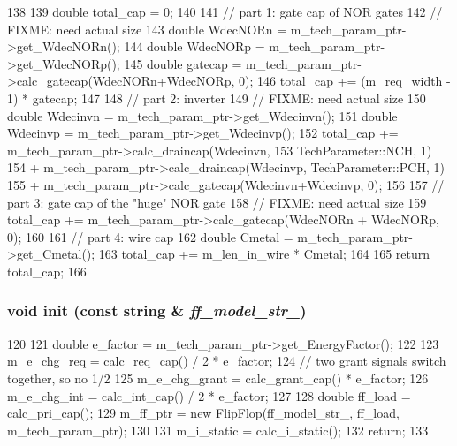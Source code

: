 \begin{DoxyCode}
138 {
139     double total_cap = 0;
140 
141     // part 1: gate cap of NOR gates
142     // FIXME: need actual size
143     double WdecNORn = m_tech_param_ptr->get_WdecNORn();
144     double WdecNORp = m_tech_param_ptr->get_WdecNORp();
145     double gatecap = m_tech_param_ptr->calc_gatecap(WdecNORn+WdecNORp, 0);
146     total_cap += (m_req_width - 1) * gatecap;
147 
148     // part 2: inverter
149     // FIXME: need actual size
150     double Wdecinvn = m_tech_param_ptr->get_Wdecinvn();
151     double Wdecinvp = m_tech_param_ptr->get_Wdecinvp();
152     total_cap += m_tech_param_ptr->calc_draincap(Wdecinvn, 
153                                                  TechParameter::NCH, 1)
154         + m_tech_param_ptr->calc_draincap(Wdecinvp, TechParameter::PCH, 1)
155         + m_tech_param_ptr->calc_gatecap(Wdecinvn+Wdecinvp, 0);
156 
157     // part 3: gate cap of the "huge" NOR gate
158     // FIXME: need actual size
159     total_cap += m_tech_param_ptr->calc_gatecap(WdecNORn + WdecNORp, 0);
160 
161     // part 4: wire cap
162     double Cmetal = m_tech_param_ptr->get_Cmetal();
163     total_cap += m_len_in_wire * Cmetal;
164 
165     return total_cap;
166 }
\end{DoxyCode}
\hypertarget{classMatrixArbiter_aa30ab0383b17214d69595df443fe4223}{
\subsubsection[{init}]{\setlength{\rightskip}{0pt plus 5cm}void init (const string \& {\em ff\_\-model\_\-str\_\-})}}
\label{classMatrixArbiter_aa30ab0383b17214d69595df443fe4223}



\begin{DoxyCode}
120 {
121     double e_factor = m_tech_param_ptr->get_EnergyFactor();
122 
123     m_e_chg_req = calc_req_cap() / 2 * e_factor;
124     // two grant signals switch together, so no 1/2
125     m_e_chg_grant = calc_grant_cap() * e_factor;
126     m_e_chg_int = calc_int_cap() / 2 * e_factor;
127 
128     double ff_load = calc_pri_cap();
129     m_ff_ptr = new FlipFlop(ff_model_str_, ff_load, m_tech_param_ptr);
130 
131     m_i_static = calc_i_static();
132     return;
133 }
\end{DoxyCode}


